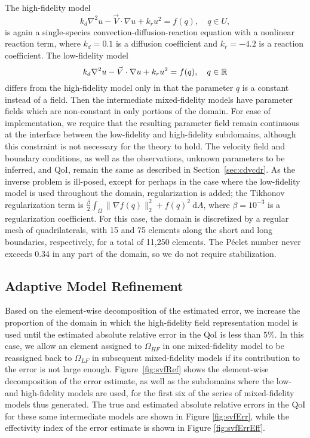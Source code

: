 The high-fidelity model 
\begin{equation}
k_d\nabla^2 u - \vec{V}\cdot\nabla u + k_ru^2= f(q),\quad q\in U,
\end{equation}
is again a single-species convection-diffusion-reaction equation with a nonlinear reaction term, where $k_d = 0.1$ is a diffusion coefficient and $k_r = -4.2$ is a reaction coefficient. The low-fidelity model
\begin{equation}
k_d\nabla^2 u - \vec{V}\cdot\nabla u + k_ru^2= f(q),\quad q\in{\mathbb{R}}
\end{equation}
differs from the high-fidelity model only in that the parameter $q$ is a constant instead of a field. Then the intermediate mixed-fidelity models have parameter fields which are non-constant in only portions of the domain. For ease of implementation, we require that the resulting parameter field remain continuous at the interface between the low-fidelity and high-fidelity subdomains, although this constraint is not necessary for the theory to hold. The velocity field and boundary conditions, as well as the observations, unknown parameters to be inferred, and QoI, remain the same as described in Section~\ref{sec:cdvcdr}. As the inverse problem is ill-posed, except for perhaps in the case where the low-fidelity model is used throughout the domain, regularization is added; the Tikhonov regularization term is $\frac{\beta}{2}\int_\Omega \|\nabla f(q)\|_2^2+f(q)^2\:\textrm{d}A$, where $\beta=10^{-3}$ is a regularization coefficient. For this case, the domain is discretized by a regular mesh of quadrilaterals, with 15 and 75 elements along the short and long boundaries, respectively, for a total of 11,250 elements. The P\'{e}clet number never exceeds 0.34 in any part of the domain, so we do not require stabilization.

\subsection{Adaptive Model Refinement} %

Based on the element-wise decomposition of the estimated error, we increase the proportion of the domain in which the high-fidelity field representation model is used until the estimated absolute relative error in the QoI is less than $5\%$. In this case, we allow an element assigned to $\Omega_{HF}$ in one mixed-fidelity model to be reassigned back to $\Omega_{LF}$ in subsequent mixed-fidelity models if its contribution to the error is not large enough. Figure~\ref{fig:svfRef} shows the element-wise decomposition of the error estimate, as well as the subdomains where the low- and high-fidelity models are used, for the first six of the series of mixed-fidelity models thus generated. The true and estimated absolute relative errors in the QoI for these same intermediate models are shown in Figure \ref{fig:svfErr}, while the effectivity index of the error estimate is shown in Figure \ref{fig:svfErrEff}. 

